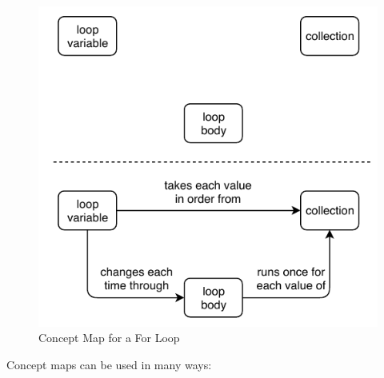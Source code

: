 \begin{figure}
\centering
\includegraphics{../docs/fig/for-loop.pdf}
\caption{Concept Map for a For Loop}
\label{f:memory-loop}
\end{figure}

Concept maps can be used in many ways:

